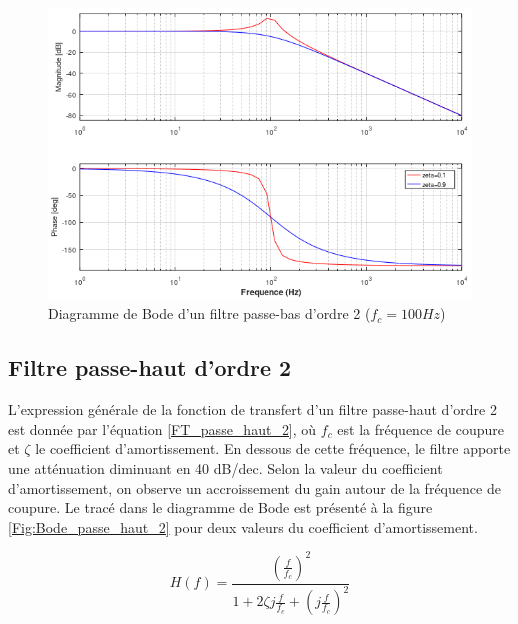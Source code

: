 	\begin{figure}[h!]
		\centering
		\includegraphics[scale=0.75]{images/Bode_passe_bas_2.png}
		\caption{Diagramme de Bode d'un filtre passe-bas d'ordre 2 ($f_{c}=100 Hz$)}	
		\label{Fig:Bode_passe_bas_2} 
	\end{figure}
	
	
	
	\subsection{Filtre passe-haut d'ordre 2}
	L'expression générale de la fonction de transfert d'un filtre passe-haut d'ordre 2 est donnée par l'équation \ref{FT_passe_haut_2}, où $f_{c}$ est la fréquence de coupure et $\zeta$ le coefficient d'amortissement. En dessous de cette fréquence, le filtre apporte une atténuation diminuant en 40 dB/dec. Selon la valeur du coefficient d'amortissement, on observe un accroissement du gain autour de la fréquence de coupure. Le tracé dans le diagramme de Bode est présenté à la figure \ref{Fig:Bode_passe_haut_2} pour deux valeurs du coefficient d'amortissement.
	
	\begin{equation}\label{FT_passe_haut_2}
	H(f) = \frac{(\frac{f}{f_{c}})^{2}}{1+2\zeta j\frac{f}{f_{c}}+(j\frac{f}{f_{c}})^{2}}
	\end{equation}
	
